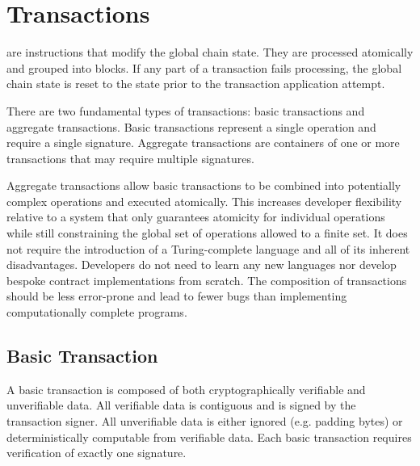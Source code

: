 \section{Transactions}
\label{sec:transactions}


 are instructions that modify the global chain state.
They are processed atomically and grouped into blocks.
If any part of a transaction fails processing, the global chain state is reset to the state prior to the transaction application attempt.

There are two fundamental types of transactions: basic transactions and aggregate transactions.
Basic transactions represent a single operation and require a single signature.
Aggregate transactions are containers of one or more transactions that may require multiple signatures.

Aggregate transactions allow basic transactions to be combined into potentially complex operations and executed atomically.
This increases developer flexibility relative to a system that only guarantees atomicity for individual operations while still constraining the global set of operations allowed to a finite set.
It does not require the introduction of a Turing-complete language and all of its inherent disadvantages.
Developers do not need to learn any new languages nor develop bespoke contract implementations from scratch.
The composition of transactions should be less error-prone and lead to fewer bugs than implementing computationally complete programs.

\subsection{Basic Transaction}

A basic transaction is composed of both cryptographically verifiable and unverifiable data.
All verifiable data is contiguous and is signed by the transaction signer.
All unverifiable data is either ignored (e.g. padding bytes) or deterministically computable from verifiable data.
Each basic transaction requires verification of exactly one signature.


